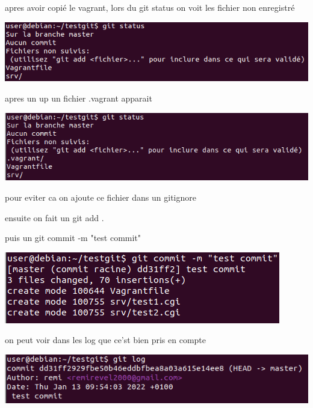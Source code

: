 \documentclass{article}
\begin{document}
 apres avoir copié le vagrant, lors du git status on voit les fichier non enregistré
 
 \begin{center}
        \includegraphics[scale=0.5]{Images/gitadd.png}
 \end{center}
 
 apres un up un fichier .vagrant apparait
 
 \begin{center}
        \includegraphics[scale=0.5]{Images/vgup.png}
 \end{center}
 
 pour eviter ca on ajoute ce fichier dans un gitignore \par
 
 ensuite on fait un git add . \par
 
 puis un git commit -m "test commit"
 
 \begin{center}
        \includegraphics[scale=0.5]{Images/gitcommit.png}
 \end{center}
 
 on peut voir dans les log que ce'st bien pris en compte
 
 \begin{center}
        \includegraphics[scale=0.5]{Images/gitlog.png}
 \end{center}
 
\end{document}
